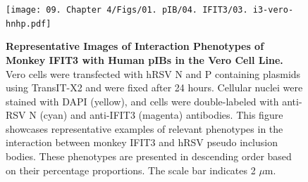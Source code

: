 \begin{figure}
    \centering
    \texttt{[image: 09. Chapter 4/Figs/01. pIB/04. IFIT3/03. i3-vero-hnhp.pdf]}
    \caption[Representative Images of Interaction Phenotypes of Monkey IFIT3 with Human pIBs in the Vero Cell Line.]{\textbf{Representative Images of Interaction Phenotypes of Monkey IFIT3 with Human pIBs in the Vero Cell Line.} Vero cells were transfected with hRSV N and P containing plasmids using TransIT-X2 and were fixed after 24 hours. Cellular nuclei were stained with DAPI (yellow), and cells were double-labeled with anti-RSV N (cyan) and anti-IFIT3 (magenta) antibodies. This figure showcases representative examples of relevant phenotypes in the interaction between monkey IFIT3 and hRSV pseudo inclusion bodies. These phenotypes are presented in descending order based on their percentage proportions. The scale bar indicates 2 \(\mu \mbox{m}\).}
    \label{fig:Representative Images of Interaction Phenotypes of Monkey IFIT3 with Human pIBs in the VERO Cell Line}
\end{figure}

